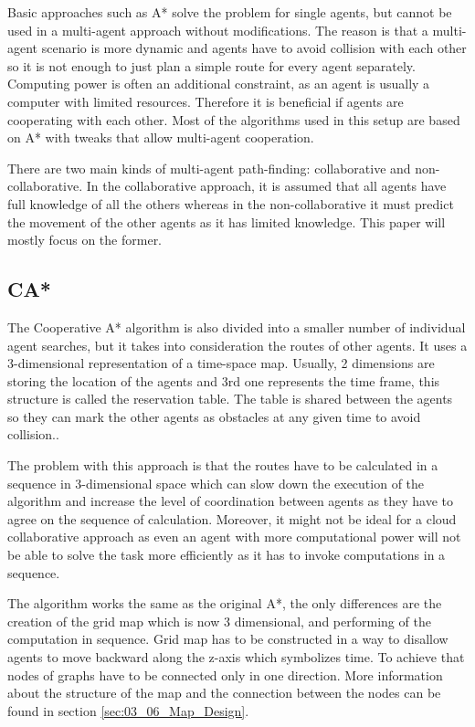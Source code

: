 Basic approaches such as A* solve the problem for single agents, but cannot be used in a multi-agent approach without modifications. The reason is that a multi-agent scenario is more dynamic and agents have to avoid collision with each other so it is not enough to just plan a simple route for every agent separately. Computing power is often an additional constraint, as an agent is usually a computer with limited resources. Therefore it is beneficial if agents are cooperating with each other. Most of the algorithms used in this setup are based on A* with tweaks that allow multi-agent cooperation\cite{path_adv}.

There are two main kinds of multi-agent path-finding: collaborative and non-collaborative. In the collaborative approach, it is assumed that all agents have full knowledge of all the others whereas in the non-collaborative it must predict the movement of the other agents as it has limited knowledge. This paper will mostly focus on the former.
\subsection{CA*}
The Cooperative A* algorithm is also divided into a smaller number of individual agent searches, but it takes into consideration the routes of other agents. It uses a 3-dimensional representation of a time-space map. Usually, 2 dimensions are storing the location of the agents and 3rd one represents the time frame, this structure is called the reservation table. The table is shared between the agents so they can mark the other agents as obstacles at any given time to avoid collision.\cite{path_adv}. 

The problem with this approach is that the routes have to be calculated in a sequence in 3-dimensional space which can slow down the execution of the algorithm and increase the level of coordination between agents as they have to agree on the sequence of calculation. Moreover, it might not be ideal for a cloud collaborative approach as even an agent with more computational power will not be able to solve the task more efficiently as it has to invoke computations in a sequence.

The algorithm works the same as the original A*, the only differences are the creation of the grid map which is now 3 dimensional, and  performing of the computation in sequence. Grid map has to be constructed in a way to disallow agents to move backward along the z-axis which symbolizes time. To achieve that nodes of graphs have to be connected only in one direction. More information about the structure of the map and the connection between the nodes can be found in section \ref{sec:03_06_Map_Design}.